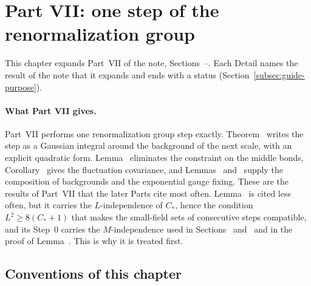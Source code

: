 \section{Part VII: one step of the renormalization group}\label{d7:sec}

This chapter expands Part~VII of the note, Sections~--. Each Detail names the result of the note that it expands and ends with a status (Section~\ref{subsec:guide-purpose}).

\paragraph{What Part VII gives.} Part~VII performs one renormalization group step exactly. Theorem~ writes the step as a Gaussian integral around the background of the next scale, with an explicit quadratic form. Lemma~ eliminates the constraint on the middle bonds, Corollary~ gives the fluctuation covariance, and Lemmas~ and~ supply the composition of backgrounds and the exponential gauge fixing. These are the results of Part~VII that the later Parts cite most often. Lemma~ is cited less often, but it carries the $L$-independence of $C_*$, hence the condition $L^2\ge8(C_*+1)$ that makes the small-field sets of consecutive steps compatible, and its Step~0 carries the $M$-independence used in Sections~ and~ and in the proof of Lemma~. This is why it is treated first.

\subsection{Conventions of this chapter}\label{d7:conv}

